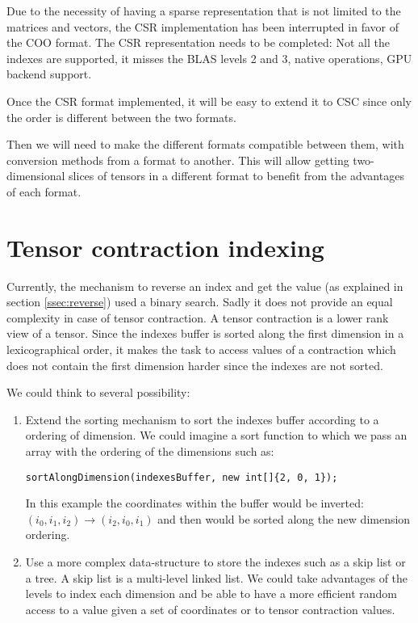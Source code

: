 Due to the necessity of having a sparse representation that is not limited to the matrices and vectors, the CSR implementation has been interrupted in favor of the COO format. The CSR representation needs to be completed: Not all the indexes are supported, it misses the BLAS levels 2 and 3, native operations, GPU backend support. 

Once the CSR format implemented, it will be easy to extend it to CSC since only the order is different between the two formats.

Then we will need to make the different formats compatible between them, with conversion methods from a format to another. This will allow getting two-dimensional slices of tensors in a different format to benefit from the advantages of each format.

\section{Tensor contraction indexing}

Currently, the mechanism to reverse an index and get the value (as explained in section \ref{ssec:reverse}) used a binary search. Sadly it does not provide an equal complexity in case of tensor contraction. A tensor contraction is a lower rank view of a tensor. Since the indexes buffer is sorted along the first dimension in a lexicographical order, it makes the task to access values of a contraction which does not contain the first dimension harder since the indexes are not sorted.

We could think to several possibility:
\begin{enumerate}
	\item Extend the sorting mechanism to sort the indexes buffer according to a ordering of dimension. We could imagine a sort function to which we pass an array with the ordering of the dimensions such as:
	\begin{lstlisting}[style=nonumbers]
		sortAlongDimension(indexesBuffer, new int[]{2, 0, 1});
	\end{lstlisting}
	In this example the coordinates within the buffer would be inverted:\\
	\qquad $(i_{0}, i_{1}, i_{2})  \rightarrow (i_{2}, i_{0}, i_{1})$  
	and then would be sorted along the new dimension ordering.
	\item Use a more complex data-structure to store the indexes such as a skip list or a tree. A skip list is a multi-level linked list. We could take advantages of the levels to index each dimension and be able to have a more efficient random access to a value given a set of coordinates or to tensor contraction values.
\end{enumerate} 

